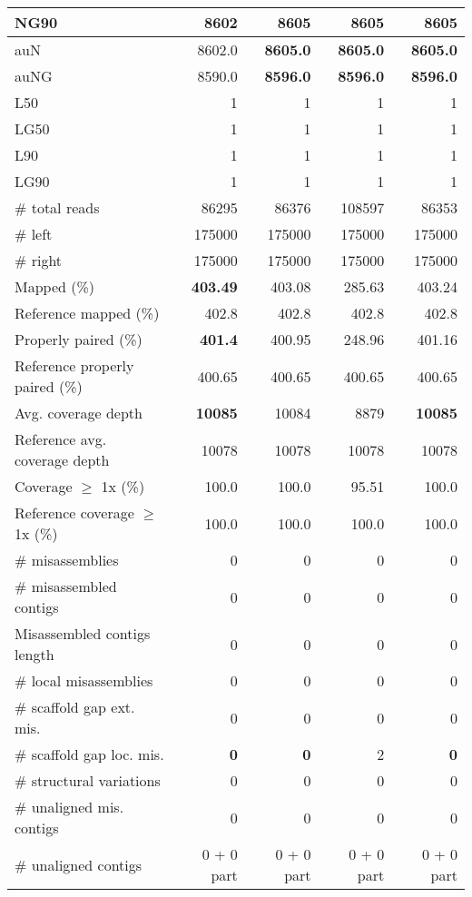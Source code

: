 \documentclass[12pt,a4paper]{article}
\begin{document}
\begin{table}[ht]
\begin{center}
\begin{tabular}{|l*{4}{|r}|}
NG90 & 8602 & {\bf 8605} & {\bf 8605} & {\bf 8605} \\ \hline
auN & 8602.0 & {\bf 8605.0} & {\bf 8605.0} & {\bf 8605.0} \\ \hline
auNG & 8590.0 & {\bf 8596.0} & {\bf 8596.0} & {\bf 8596.0} \\ \hline
L50 & 1 & 1 & 1 & 1 \\ \hline
LG50 & 1 & 1 & 1 & 1 \\ \hline
L90 & 1 & 1 & 1 & 1 \\ \hline
LG90 & 1 & 1 & 1 & 1 \\ \hline
\# total reads & 86295 & 86376 & 108597 & 86353 \\ \hline
\# left & 175000 & 175000 & 175000 & 175000 \\ \hline
\# right & 175000 & 175000 & 175000 & 175000 \\ \hline
Mapped (\%) & {\bf 403.49} & 403.08 & 285.63 & 403.24 \\ \hline
Reference mapped (\%) & 402.8 & 402.8 & 402.8 & 402.8 \\ \hline
Properly paired (\%) & {\bf 401.4} & 400.95 & 248.96 & 401.16 \\ \hline
Reference properly paired (\%) & 400.65 & 400.65 & 400.65 & 400.65 \\ \hline
Avg. coverage depth & {\bf 10085} & 10084 & 8879 & {\bf 10085} \\ \hline
Reference avg. coverage depth & 10078 & 10078 & 10078 & 10078 \\ \hline
Coverage $\geq$ 1x (\%) & 100.0 & 100.0 & 95.51 & 100.0 \\ \hline
Reference coverage $\geq$ 1x (\%) & 100.0 & 100.0 & 100.0 & 100.0 \\ \hline
\# misassemblies & 0 & 0 & 0 & 0 \\ \hline
\# misassembled contigs & 0 & 0 & 0 & 0 \\ \hline
Misassembled contigs length & 0 & 0 & 0 & 0 \\ \hline
\# local misassemblies & 0 & 0 & 0 & 0 \\ \hline
\# scaffold gap ext. mis. & 0 & 0 & 0 & 0 \\ \hline
\# scaffold gap loc. mis. & {\bf 0} & {\bf 0} & 2 & {\bf 0} \\ \hline
\# structural variations & 0 & 0 & 0 & 0 \\ \hline
\# unaligned mis. contigs & 0 & 0 & 0 & 0 \\ \hline
\# unaligned contigs & 0 + 0 part & 0 + 0 part & 0 + 0 part & 0 + 0 part \\ \hline

\end{tabular}
\end{center}
\end{table}
\end{document}
